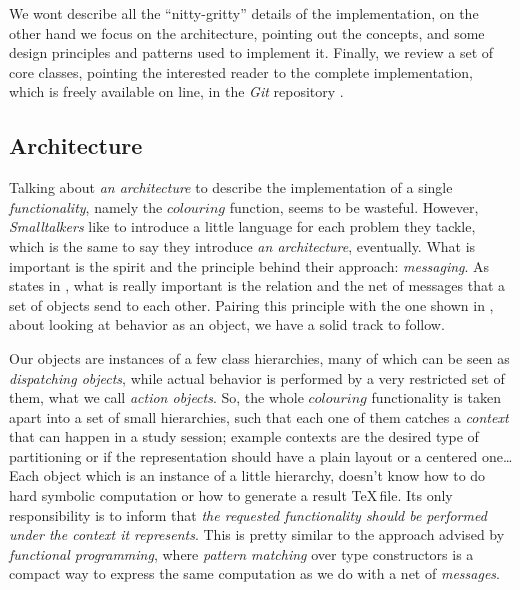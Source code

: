 We  wont describe all the ``nitty-gritty'' details of the
implementation, on the other hand we focus on the architecture, pointing out
the concepts, and some design principles and patterns used to implement it.
Finally, we review a set of core classes, pointing the interested reader to the
complete implementation, which is freely available on line, in the \emph{Git}
repository \cite{nocentini:git:repository}.

\subsection{Architecture}

Talking about \emph{an architecture} to describe the implementation of a single
\emph{functionality}, namely the $colouring$ function, seems to be wasteful.
However, \emph{Smalltalkers} like to introduce a little language for each
problem they tackle, which is the same to say they introduce \emph{an
architecture}, eventually. What is important is the spirit and the principle
behind their approach: \emph{messaging}. As \citeauthor{kay:on:messaging}
states in \cite{kay:on:messaging}, what is really important is the relation and
the net of messages that a set of objects send to each other. Pairing this
principle with the one shown in
\cite{friedman:felleisen:few:java:few:patterns}, about looking at behavior as
an object, we have a solid track to follow.

Our objects are instances of a few class hierarchies, many of which can be seen
 as \emph{dispatching objects}, while
actual behavior is performed by a very restricted set of them, what we call
\emph{action objects}. So, the whole $colouring$ functionality is taken apart
into a set of small hierarchies, such that each one of them catches a
\emph{context} that can happen in a study session; example contexts are the
desired type of partitioning or if the representation should have a plain
layout or a centered one\ldots Each object which is an instance of a little
hierarchy, doesn't know how to do hard symbolic computation or how to generate
a result \TeX\,file. Its only responsibility is to inform that \emph{the
requested functionality should be performed under the context it represents}.
This is pretty similar to the approach advised by \emph{functional
programming}, where \emph{pattern matching} over type constructors is a compact
way to express the same computation as we do with a net of \emph{messages}.

